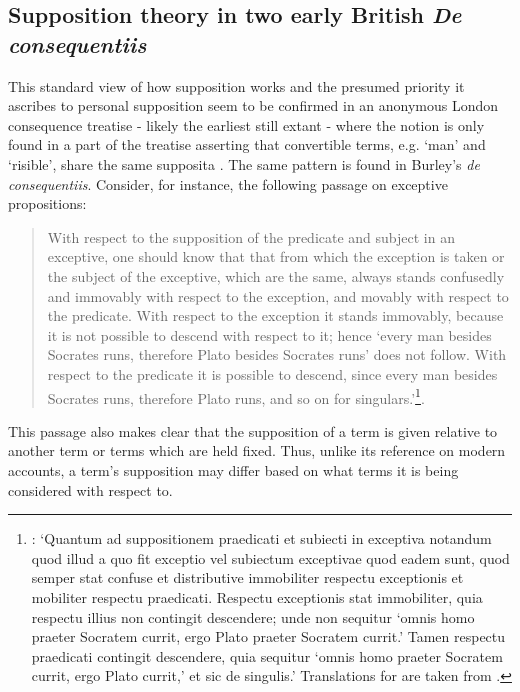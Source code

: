 \documentclass[a4paper, 11pt]{article}
\begin{document}
\subsection{Supposition theory in two early British \emph{De consequentiis}}
This standard view of how supposition works and the presumed priority it ascribes to personal supposition seem to be confirmed in an anonymous London consequence treatise - likely the earliest still extant - where the notion is only found in a part of the treatise asserting that convertible terms, e.g. `man' and `risible', share the same supposita \autocite[9, par. 27]{Green-Pedersen1980a}. The same pattern is found in Burley's \emph{de consequentiis}. Consider, for instance, the following passage on exceptive propositions:
\begin{quote}
With respect to the supposition of the predicate and subject in an exceptive, one should know that that from which the exception is taken or the subject of the exceptive, which are the same, always stands confusedly and immovably with respect to the exception, and movably with respect to the predicate. With respect to the exception it stands immovably, because it is not possible to descend with respect to it; hence `every man besides Socrates runs, therefore Plato besides Socrates runs' does not follow. With respect to the predicate it is possible to descend, since every man besides Socrates runs, therefore Plato runs, and so on for singulars.'\footnote{\autocite[124, par. 58]{Green-Pedersen1980b}: `Quantum ad suppositionem praedicati et subiecti in exceptiva notandum quod illud a quo fit exceptio vel subiectum exceptivae quod eadem sunt, quod semper stat confuse et distributive immobiliter respectu exceptionis et mobiliter respectu praedicati. Respectu exceptionis stat immobiliter, quia respectu illius non contingit descendere; unde non sequitur `omnis homo praeter Socratem currit, ergo Plato praeter Socratem currit.' Tamen respectu praedicati contingit descendere, quia sequitur `omnis homo praeter Socratem currit, ergo Plato currit,' et sic de singulis.' Translations for \autocite{Green-Pedersen1980a,Green-Pedersen1980b} are taken from \autocite[171-273]{Archambault2017d}.}.
\end{quote}
This passage also makes clear that the supposition of a term is given relative to another term or terms which are held fixed. Thus, unlike its reference on modern accounts, a term's supposition may differ based on what terms it is being considered with respect to.
\end{document}

